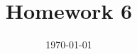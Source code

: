 




\documentclass[11pt, a4paper, UTF8]{ctexart}
\usepackage{tikz}
\usetikzlibrary{shapes.geometric, arrows}



\title{Homework 6}
\date{\today}


\thispagestyle{empty}
\maketitle

\beginthishw
\begin{problem}[Naive Bayes Classifier]

\end{problem}



